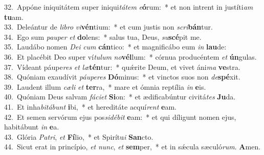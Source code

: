 {32.~}Appóne iniquitátem super iniqui\textit{tá}\textit{tem} \textit{e}\textbf{ó}rum:~* et non intrent in justíti\textit{am} \textbf{tu}am.\\
{33.~}Deleántur de \textit{li}\textit{bro} \textit{vi}\textbf{vén}tium:~* et cum justis non \textit{scri}\textbf{bán}tur.\\
{34.~}Ego sum \textit{pau}\textit{per} \textit{et} \textbf{do}lens:~* salus tua, Deus, \textit{su}\textbf{scé}pit me.\\
{35.~}Laudábo nomen \textit{De}\textit{i} \textit{cum} \textbf{cán}tico:~* et magnificábo eum \textit{in} \textbf{lau}de:\\
{36.~}Et placébit Deo super ví\textit{tu}\textit{lum} \textit{no}\textbf{vél}lum:~* córnua producéntem \textit{et} \textbf{ún}gulas.\\
{37.~}Vídeant páupe\textit{res} \textit{et} \textit{læ}\textbf{tén}tur:~* quǽrite Deum, et vivet áni\textit{ma} \textbf{ve}stra.\\
{38.~}Quóniam exaudívit \textit{páu}\textit{pe}\textit{res} \textbf{Dó}minus:~* et vinctos suos non \textit{de}\textbf{spé}xit.\\
{39.~}Laudent illum \textit{cæ}\textit{li} \textit{et} \textbf{ter}ra,~* mare et ómnia reptília \textit{in} \textbf{e}is.\\
{40.~}Quóniam Deus salvam \textit{fá}\textit{ci}\textit{et} \textbf{Si}on:~* et ædificabúntur civitá\textit{tes} \textbf{Ju}da.\\
{41.~}Et inha\textit{bi}\textit{tá}\textit{bunt} \textbf{i}bi,~* et hereditáte acquí\textit{rent} \textbf{e}am.\\
{42.~}Et semen servórum ejus pos\textit{si}\textit{dé}\textit{bit} \textbf{e}am:~* et qui díligunt nomen ejus, habitábunt \textit{in} \textbf{e}a.\\
{43.~}Glória \textit{Pa}\textit{tri}, \textit{et} \textbf{Fí}lio,~* et Spirítu\textit{i} \textbf{San}cto.\\
{44.~}Sicut erat in princípio, \textit{et} \textit{nunc}, \textit{et} \textbf{sem}per,~* et in sǽcula sæculó\textit{rum}. \textbf{A}men.\\
